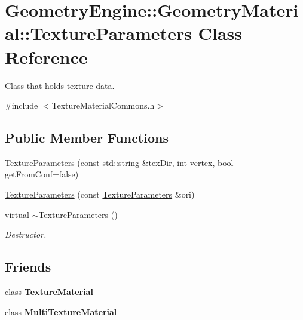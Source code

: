 \hypertarget{class_geometry_engine_1_1_geometry_material_1_1_texture_parameters}{}\section{Geometry\+Engine\+::Geometry\+Material\+::Texture\+Parameters Class Reference}
\label{class_geometry_engine_1_1_geometry_material_1_1_texture_parameters}


Class that holds texture data.  




{\ttfamily \#include $<$Texture\+Material\+Commons.\+h$>$}

\subsection*{Public Member Functions}
\begin{DoxyCompactItemize}
\item 
\mbox{\hyperlink{class_geometry_engine_1_1_geometry_material_1_1_texture_parameters_a1be8bba083e1de636196e4520312cc86}{Texture\+Parameters}} (const std\+::string \&tex\+Dir, int vertex, bool get\+From\+Conf=false)
\item 
\mbox{\hyperlink{class_geometry_engine_1_1_geometry_material_1_1_texture_parameters_abbda2d6bc0bfc273cd8454acc8b326b7}{Texture\+Parameters}} (const \mbox{\hyperlink{class_geometry_engine_1_1_geometry_material_1_1_texture_parameters}{Texture\+Parameters}} \&ori)
\item 
\mbox{\label{class_geometry_engine_1_1_geometry_material_1_1_texture_parameters_a2ef598f10049c0d1a0c5aa2f2a56ffa3}} 
virtual \mbox{\hyperlink{class_geometry_engine_1_1_geometry_material_1_1_texture_parameters_a2ef598f10049c0d1a0c5aa2f2a56ffa3}{$\sim$\+Texture\+Parameters}} ()
\begin{DoxyCompactList}\small\item\em Destructor. \end{DoxyCompactList}\end{DoxyCompactItemize}
\subsection*{Friends}
\begin{DoxyCompactItemize}
\item 
\mbox{\label{class_geometry_engine_1_1_geometry_material_1_1_texture_parameters_aea3ac4c0659edca9ccbfd85ad9ef7352}} 
class {\bfseries Texture\+Material}
\item 
\mbox{\label{class_geometry_engine_1_1_geometry_material_1_1_texture_parameters_af2582dec448771a683290c8491dce49a}} 
class {\bfseries Multi\+Texture\+Material}
\end{DoxyCompactItemize}


